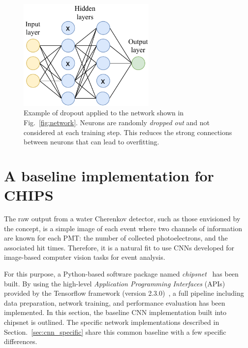 \begin{figure} %
    \includegraphics[width=0.6\textwidth]{diagrams/6-cnn/dropout.pdf}
    \caption[Illustration of dropout]
    {Example of dropout applied to the network shown in Fig.~\ref{fig:network}. Neurons are
        randomly \emph{dropped out} and not considered at each training step. This reduces the
        strong connections between neurons that can lead to overfitting.}
    \label{fig:dropout}
\end{figure}

\section{A baseline implementation for CHIPS} %
\label{sec:cnn_baseline} %

The raw output from a water Cherenkov detector, such as those envisioned by the \chips concept, is
a simple image of each event where two channels of information are known for each PMT: the number
of collected photoelectrons, and the associated hit times. Therefore, it is a natural fit to use
CNNs developed for image-based computer vision tasks for \chips event analysis.

For this purpose, a Python-based software package named \emph{chipsnet}~\cite{chipsnet2020} has
been built. By using the high-level \emph{Application Programming Interfaces} (APIs) provided by
the Tensorflow framework (version 2.3.0)~\cite{tf2015}, a full pipeline including data
preparation, network training, and performance evaluation has been implemented. In this section,
the baseline CNN implementation built into chipsnet is outlined. The specific network
implementations described in Section.~\ref{sec:cnn_specific} share this common baseline with a few
specific differences.

